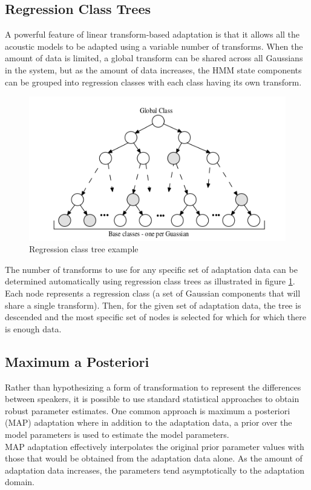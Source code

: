 \subsection{Regression Class Trees}\label{rcs}
A powerful feature of linear transform-based adaptation is that it allows all the acoustic models to be adapted using a variable number of transforms. When the amount of data is limited, a global transform can be shared across all Gaussians in the system, but as the amount of data increases, the HMM state components can be grouped into regression classes with each class having its own transform.\\
\begin{figure}[!htb]
	\begin{center}
	\includegraphics[width=1\textwidth]{img/RC2.png}
	\end{center}
	\caption{\label{rcimg}Regression class tree example}
\end{figure}
The number of transforms to use for any specific set of adaptation data can be determined automatically using regression class trees as illustrated in figure \ref{rcimg}. Each node represents a regression class (a set of Gaussian components that will share a single transform). Then, for the given set of adaptation data, the tree is descended and the most specific set of nodes is selected for which for which there is enough data.
\subsection{Maximum a Posteriori}\label{map}
Rather than hypothesizing a form of transformation to represent the differences between speakers, it is possible to use standard statistical approaches to obtain robust parameter estimates. One common approach is maximum a posteriori (MAP) adaptation where in addition to the adaptation data, a prior over the model parameters is used to estimate the model parameters.\\
MAP adaptation effectively interpolates the original prior parameter values with those that would be obtained from the adaptation data alone. As the amount of adaptation data increases, the parameters tend asymptotically to the adaptation domain.

